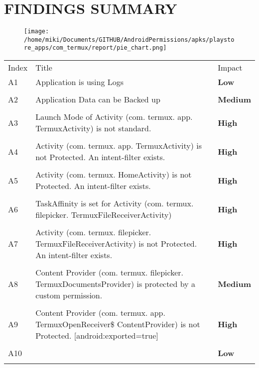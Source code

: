 \documentclass[12p]{article}
\begin{document}
\section{FINDINGS SUMMARY}\label{sec:summary}
\begin{figure}[H]
\centering
	\texttt{[image: /home/miki/Documents/GITHUB/AndroidPermissions/apks/playstore\_apps/com\_termux/report/pie\_chart.png]}
\end{figure}
	\begin{longtable}{p{0.5cm} p{10cm} p{1.5cm}}
	\rowcolor{grannysmithapple!70} Index & Title & Impact \\
	A1&Application is using Logs& \color{amber}\textbf{Low} \\
\hline\\	A2&Application Data can be Backed up& \color{orange(colorwheel)}\textbf{Medium} \\
\hline\\	A3&Launch Mode of Activity \newline (com. termux. app. TermuxActivity) is not standard.& \color{ferrarired}\textbf{High} \\
\hline\\	A4&Activity \newline (com. termux. app. TermuxActivity) is not Protected. An intent-filter exists.& \color{ferrarired}\textbf{High} \\
\hline\\	A5&Activity \newline (com. termux. HomeActivity) is not Protected. An intent-filter exists.& \color{ferrarired}\textbf{High} \\
\hline\\	A6&TaskAffinity is set for Activity \newline (com. termux. filepicker. TermuxFileReceiverActivity)& \color{ferrarired}\textbf{High} \\
\hline\\	A7&Activity \newline (com. termux. filepicker. TermuxFileReceiverActivity) is not Protected. An intent-filter exists.& \color{ferrarired}\textbf{High} \\
\hline\\	A8&Content Provider \newline (com. termux. filepicker. TermuxDocumentsProvider) is protected by a custom permission.& \color{orange(colorwheel)}\textbf{Medium} \\
\hline\\	A9&Content Provider \newline (com. termux. app. TermuxOpenReceiver\$ ContentProvider) is not Protected. [android:exported=true]& \color{ferrarired}\textbf{High} \\
\hline\\	A10&& \color{amber}\textbf{Low} \\
\hline\\	\end{longtable}
\cleardoublepage
\newpage
\end{document}
